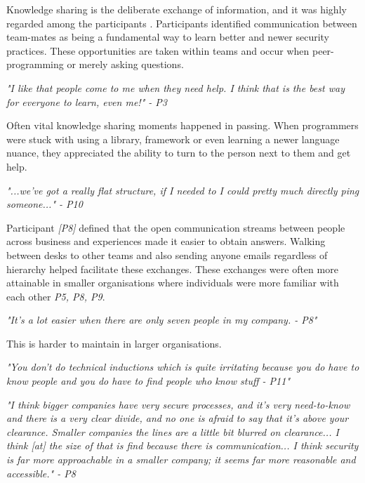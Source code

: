 Knowledge sharing is the deliberate exchange of information, and it was highly regarded among the participants \cite{know}. Participants identified communication between team-mates as being a fundamental way to learn better and newer security practices. These opportunities are taken within teams and occur when peer-programming or merely asking questions. 
\newline
\par
\textit{"I like that people come to me when they need help. I think that is the best way for everyone to learn, even me!" - P3}
\newline
\par
Often vital knowledge sharing moments happened in passing. When programmers were stuck with using a library, framework or even learning a newer language nuance, they appreciated the ability to turn to the person next to them and get help. 
\newline
\par \textit{"...we've got a really flat structure, if I needed to I could pretty much directly ping someone..." - P10 }
\newline
\par
Participant \textit{[P8]} defined that the open communication streams between people across business and experiences made it easier to obtain answers. Walking between desks to other teams and also sending anyone emails regardless of hierarchy helped facilitate these exchanges. These exchanges were often more attainable in smaller organisations where individuals were more familiar with each other \textit{{P5, P8, P9}}. 
\newline
\par 
\textit{"It's a lot easier when there are only seven people in my company. - P8"}
\newline
\par
This is harder to maintain in larger organisations. 
\newline
\par
\textit{"You don't do technical inductions which is quite irritating  because you do have to know people and you do have to  find people who know stuff - P11"}
\newline
\par
\textit{"I think bigger companies have very secure processes, and it's very need-to-know and there is a very clear divide, and no one is afraid to say that it's above your clearance. Smaller companies the lines are a little bit blurred on clearance... I think [at] the size of that is find because there is communication... I think security is far more approachable in a smaller company; it seems far more reasonable and accessible." - P8}


